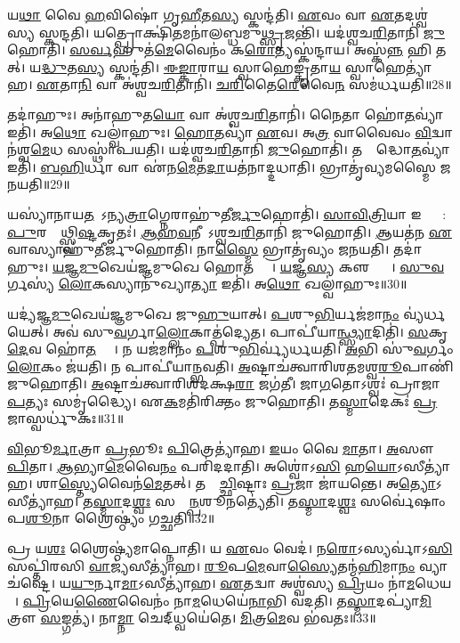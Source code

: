 𑌯\ul{𑌥𑌾} 𑌵𑍈 \ul{𑌹}𑌵𑌿𑌷𑍋॑ 𑌗𑍃\ul{𑌹𑍀}𑌤\ul{𑌸𑍍𑌯} 𑌸𑍍𑌕𑌨𑍍𑌦॑𑌤𑌿।
\ul{𑌏}𑌵𑌂 𑌵𑌾 \ul{𑌏}𑌤𑌦𑌶𑍍𑌵॑𑌸𑍍𑌯 𑌸𑍍𑌕𑌨𑍍𑌦𑌤𑌿।
𑌯𑌤𑍍𑌪𑍍𑌰𑍋𑌕𑍍𑌷𑌿॑\ul{𑌤}𑌮𑌨𑌾॑𑌲𑌬𑍍𑌧𑌮𑍁\ul{𑌥𑍍𑌸𑍃}𑌜𑌨𑍍𑌤𑌿॑।
𑌯𑌦॑𑌶𑍍𑌵𑌚\ul{𑌰𑌿}𑌤𑌾𑌨𑌿॑ \ul{𑌜𑍁}𑌹𑍋𑌤𑌿॑।
\ul{𑌸}\ul{𑌰𑍍𑌵}𑌹𑍁𑌤॑\ul{𑌮𑍇}𑌵𑍈𑌨𑌂॑ 𑌕\ul{𑌰𑍋}𑌤𑍍𑌯𑌸𑍍𑌕॑𑌨𑍍𑌦𑌾𑌯।
𑌅𑌸𑍍𑌕॑\ul{𑌨𑍍𑌨}\ul{} 𑌹𑌿 𑌤𑌤𑍍।
𑌯\ul{𑌦𑍍𑌧𑍁}𑌤\ul{𑌸𑍍𑌯} 𑌸𑍍𑌕𑌨𑍍𑌦॑𑌤𑌿।
\ul{𑌈}\ul{𑌙𑍍𑌕𑌾}𑌰𑌾\ul{𑌯} 𑌸𑍍𑌵𑌾𑌹𑍇𑌙𑍍𑌕𑍃॑𑌤𑌾\ul{𑌯} 𑌸𑍍𑌵𑌾𑌹𑍇𑌤𑍍𑌯𑌾॑𑌹।
\ul{𑌏}𑌤𑌾\ul{𑌨𑌿} 𑌵𑌾 𑌅॑𑌶𑍍𑌵𑌚\ul{𑌰𑌿}𑌤𑌾𑌨𑌿॑।
\ul{𑌚}\ul{𑌰𑌿}𑌤𑍈\ul{𑌰𑍇}𑌵𑍈\ul{𑌨}\ul{} 𑌸𑌮॑𑌰𑍍𑌧𑌯𑌤𑌿॥28॥

𑌤𑌦𑌾॑𑌹𑍁𑌃।
𑌅𑌨𑌾॑𑌹𑍁𑌤\ul{𑌯𑍋} 𑌵𑌾 𑌅॑𑌶𑍍𑌵𑌚\ul{𑌰𑌿}𑌤𑌾𑌨𑌿॑।
𑌨𑍈𑌤𑌾 𑌹𑍋॑\ul{𑌤}𑌵𑍍𑌯𑌾॑ 𑌇𑌤𑌿॑।
𑌅\ul{𑌥𑍋} 𑌖𑌲𑍍𑌵𑌾॑𑌹𑍁𑌃।
\ul{𑌹𑍋}\ul{𑌤}𑌵𑍍𑌯𑌾॑ \ul{𑌏}𑌵।
𑌅\ul{𑌤𑍍𑌰} 𑌵𑌾𑌵𑍈𑌵𑌂 \ul{𑌵𑌿}𑌦𑍍𑌵𑌾𑌨॑𑌶𑍍𑌵\ul{𑌮𑍇}𑌧 𑌸𑌸𑍍𑌥𑌾॑𑌪𑌯𑌤𑌿।
𑌯𑌦॑𑌶𑍍𑌵𑌚\ul{𑌰𑌿}𑌤𑌾𑌨𑌿॑ \ul{𑌜𑍁}𑌹𑍋𑌤𑌿॑।
𑌤𑌸𑍍𑌮𑌾᳚𑌦𑍍𑌧𑍋\ul{𑌤}𑌵𑍍𑌯𑌾॑ 𑌇𑌤𑌿॑।
\ul{𑌬}\ul{𑌹𑌿}𑌰𑍍𑌧𑌾 𑌵𑌾 𑌏॑𑌨\ul{𑌮𑍇}𑌤\ul{𑌦𑌾}𑌯𑌤॑𑌨𑌾𑌦𑍍𑌦𑌧𑌾𑌤𑌿।
𑌭𑍍𑌰𑌾𑌤𑍃॑𑌵𑍍𑌯𑌮𑌸𑍍𑌮𑍈 𑌜𑌨𑌯𑌤𑌿॥29॥

𑌯𑌸𑍍𑌯𑌾॑𑌨𑌾𑌯\ul{𑌤}𑌨𑍇᳚\-𑌽𑌨𑍍𑌯\ul{𑌤𑍍𑌰𑌾}𑌗𑍍𑌨𑍇𑌰𑌾𑌹𑍁॑𑌤𑍀\ul{𑌰𑍍𑌜𑍁}𑌹𑍋𑌤𑌿॑।
\ul{𑌸𑌾}\ul{𑌵𑌿}\ul{𑌤𑍍𑌰𑌿}𑌯𑌾 𑌇𑌷𑍍𑌟𑍍𑌯𑌾᳚: \ul{𑌪𑍁}𑌰𑌸𑍍𑌤𑌾᳚𑌥𑍍𑌸𑍍𑌵𑌿\ul{𑌷𑍍𑌟}𑌕𑍃𑌤𑌃॑।
\ul{𑌆}\ul{𑌹}\ul{𑌵}𑌨𑍀𑌯𑍇᳚\-𑌽𑌶𑍍𑌵𑌚\ul{𑌰𑌿}𑌤𑌾𑌨𑌿॑ 𑌜𑍁𑌹𑍋𑌤𑌿।
\ul{𑌆}𑌯𑌤॑𑌨 \ul{𑌏}𑌵𑌾𑌸𑍍𑌯𑌾𑌹𑍁॑𑌤𑍀𑌰𑍍𑌜𑍁𑌹𑍋𑌤𑌿।
𑌨𑌾\ul{𑌸𑍍𑌮𑍈} 𑌭𑍍𑌰𑌾𑌤𑍃॑𑌵𑍍𑌯𑌂 𑌜𑌨𑌯𑌤𑌿।
𑌤𑌦𑌾॑𑌹𑍁𑌃।
\ul{𑌯}\ul{𑌜𑍍𑌞}\ul{𑌮𑍁}𑌖𑍇𑌯॑𑌜𑍍𑌞𑌮𑍁𑌖𑍇 𑌹𑍋\ul{𑌤}𑌵𑍍𑌯𑌾𑌃᳚।
\ul{𑌯}𑌜𑍍𑌞\ul{𑌸𑍍𑌯} 𑌕𑍢𑌪𑍍𑌤𑍍𑌯𑍈᳚।
\ul{𑌸𑍁}\ul{𑌵}𑌰𑍍𑌗𑌸𑍍𑌯॑ \ul{𑌲𑍋}𑌕𑌸𑍍𑌯𑌾𑌨𑍁॑𑌖𑍍𑌯𑌾\ul{𑌤𑍍𑌯𑌾} 𑌇𑌤𑌿॑।
𑌅\ul{𑌥𑍋} 𑌖𑌲𑍍𑌵𑌾॑𑌹𑍁𑌃॥30॥

𑌯𑌦𑍍𑌯॑𑌜𑍍𑌞\ul{𑌮𑍁}𑌖𑍇𑌯॑𑌜𑍍𑌞𑌮𑍁𑌖𑍇 𑌜𑍁\ul{𑌹𑍁}𑌯𑌾𑌤𑍍।
\ul{𑌪}𑌶𑍁\ul{𑌭𑌿}𑌰𑍍𑌯𑌜॑𑌮𑌾\ul{𑌨𑌂} 𑌵𑍍𑌯॑𑌰𑍍𑌧𑌯𑍇𑌤𑍍।
𑌅𑌵॑ 𑌸𑍁\ul{𑌵}𑌰𑍍𑌗𑌾\ul{𑌲𑍍𑌲𑍋}𑌕𑌾𑌤𑍍𑌪॑𑌦𑍍𑌯𑍇𑌤।
𑌪𑌾𑌪𑍀॑𑌯𑌾\ul{𑌨𑍍𑌥𑍍𑌸𑍍𑌯𑌾}𑌦𑌿𑌤𑌿॑।
\ul{𑌸}𑌕𑍃\ul{𑌦𑍇}𑌵 𑌹𑍋॑\ul{𑌤}𑌵𑍍𑌯𑌾𑌃᳚।
𑌨 𑌯𑌜॑𑌮𑌾𑌨𑌂 \ul{𑌪}𑌶𑍁\ul{𑌭𑌿}𑌰𑍍𑌵𑍍𑌯॑𑌰𑍍𑌧𑌯𑌤𑌿।
\ul{𑌅}𑌭𑌿 𑌸𑍁॑\ul{𑌵}𑌰𑍍𑌗𑌂 \ul{𑌲𑍋}𑌕𑌂 𑌜॑𑌯𑌤𑌿।
𑌨 𑌪𑌾𑌪𑍀॑𑌯𑌾𑌨𑍍𑌭𑌵𑌤𑌿।
\ul{𑌅}𑌷𑍍𑌟𑌾𑌚॑𑌤𑍍𑌵𑌾𑌰𑌿𑌶𑌤𑌮𑌶𑍍𑌵\ul{𑌰𑍂}𑌪𑌾𑌣𑌿॑ 𑌜𑍁𑌹𑍋𑌤𑌿।
\ul{𑌅}𑌷𑍍𑌟𑌾𑌚॑𑌤𑍍𑌵𑌾𑌰𑌿𑌶𑌦𑌕𑍍𑌷\ul{𑌰𑌾} 𑌜𑌗॑𑌤𑍀।
𑌜𑌾\ul{𑌗}𑌤𑍋\-𑌽𑌶𑍍𑌵𑌃॑ 𑌪𑍍𑌰𑌾𑌜𑌾\ul{𑌪}𑌤𑍍𑌯𑌃 𑌸𑌮𑍃॑𑌦𑍍𑌧𑍍𑌯𑍈।
𑌏\ul{𑌕}𑌮𑌤𑌿॑𑌰𑌿𑌕𑍍𑌤𑌂 𑌜𑍁𑌹𑍋𑌤𑌿।
𑌤\ul{𑌸𑍍𑌮𑌾}𑌦𑍇𑌕𑌃॑ \ul{𑌪𑍍𑌰}𑌜𑌾𑌸𑍍𑌵𑌰𑍍𑌧𑍁॑𑌕𑌃॥31॥\anuvakamend[\ul{𑌅}\ul{𑌰𑍍𑌧}\ul{𑌯}\ul{𑌤𑌿} \ul{𑌜}\ul{𑌨}\ul{𑌯}\ul{𑌤𑌿} 𑌖𑌲𑍍𑌵𑌾॑\ul{𑌹𑍁}𑌰𑍍𑌜𑌗॑\ul{𑌤𑍀} 𑌤𑍍𑌰𑍀𑌣𑌿॑ 𑌚]

\ul{𑌵𑌿}𑌭𑍂\ul{𑌰𑍍𑌮𑌾}𑌤𑍍𑌰𑌾 \ul{𑌪𑍍𑌰}𑌭𑍂𑌃 \ul{𑌪𑌿}𑌤𑍍𑌰𑍇𑌤𑍍𑌯𑌾॑𑌹।
\ul{𑌇}𑌯𑌂 𑌵𑍈 \ul{𑌮𑌾}𑌤𑌾।
\ul{𑌅}𑌸𑍗 \ul{𑌪𑌿}𑌤𑌾।
\ul{𑌆}𑌭𑍍𑌯𑌾\ul{𑌮𑍇}𑌵𑍈\ul{𑌨𑌂} 𑌪𑌰𑌿॑𑌦𑌦𑌾𑌤𑌿।
𑌅𑌶𑍍𑌵𑍋॑𑌽\ul{𑌸𑌿} 𑌹\ul{𑌯𑍋}\-𑌽𑌸𑍀𑌤𑍍𑌯𑌾॑𑌹।
𑌶𑌾\ul{𑌸𑍍𑌤𑍍𑌯𑍇}𑌵𑍈𑌨॑\ul{𑌮𑍇}𑌤𑌤𑍍।
𑌤𑌸𑍍𑌮𑌾᳚\ul{𑌚𑍍𑌛𑌿}𑌷𑍍𑌟𑌾𑌃 \ul{𑌪𑍍𑌰}𑌜𑌾 𑌜𑌾॑𑌯𑌨𑍍𑌤𑍇।
𑌅\ul{𑌤𑍍𑌯𑍋}\-𑌽𑌸𑍀𑌤𑍍𑌯𑌾॑𑌹।
𑌤\ul{𑌸𑍍𑌮𑌾}𑌦\ul{𑌶𑍍𑌵𑌃} 𑌸𑌰𑍍𑌵𑌾᳚\ul{𑌨𑍍𑌪}𑌶𑍂𑌨𑌤𑍍𑌯𑍇॑𑌤𑌿।
𑌤\ul{𑌸𑍍𑌮𑌾}𑌦\ul{𑌶𑍍𑌵𑌃} 𑌸𑌰𑍍𑌵𑍇॑𑌷𑌾𑌂 𑌪\ul{𑌶𑍂}𑌨𑌾 𑌶𑍍𑌰𑍈𑌷𑍍𑌠𑍍𑌯𑌂॑ 𑌗𑌚𑍍𑌛𑌤𑌿॥32॥

𑌪𑍍𑌰 𑌯\ul{𑌶𑌃} 𑌶𑍍𑌰𑍈𑌷𑍍𑌠𑍍𑌯॑𑌮𑌾𑌪𑍍𑌨𑍋𑌤𑌿।
𑌯 \ul{𑌏}𑌵𑌂 𑌵𑍇𑌦॑।
𑌨\ul{𑌰𑍋}𑌽𑌸𑍍𑌯𑌰𑍍𑌵𑌾॑𑌽\ul{𑌸𑌿} 𑌸𑌪𑍍𑌤𑌿॑𑌰𑌸𑌿 \ul{𑌵𑌾}𑌜𑍍𑌯॑𑌸𑍀𑌤𑍍𑌯𑌾॑𑌹।
\ul{𑌰𑍂}𑌪\ul{𑌮𑍇}𑌵𑌾\ul{𑌸𑍍𑌯𑍈}𑌤𑌨𑍍𑌮॑\ul{𑌹𑌿}𑌮𑌾\ul{𑌨𑌂} 𑌵𑍍𑌯𑌾𑌚॑𑌷𑍍𑌟𑍇।
𑌯\ul{𑌯𑍁}𑌰𑍍𑌨𑌾\ul{𑌮𑌾}\-𑌽𑌸𑍀𑌤𑍍𑌯𑌾॑𑌹।
\ul{𑌏}𑌤𑌦𑍍𑌵𑌾 𑌅𑌶𑍍𑌵॑𑌸𑍍𑌯 \ul{𑌪𑍍𑌰𑌿}𑌯𑌂 𑌨𑌾॑\ul{𑌮}𑌧𑍇𑌯𑌮𑍍᳚।
\ul{𑌪𑍍𑌰𑌿}𑌯𑍇\ul{𑌣𑍈}𑌵𑍈𑌨𑌂॑ 𑌨𑌾\ul{𑌮}𑌧𑍇𑌯𑍇॑\ul{𑌨𑌾}𑌭𑌿 𑌵॑𑌦𑌤𑌿।
𑌤\ul{𑌸𑍍𑌮𑌾}𑌦𑌪𑍍𑌯𑌾॑\ul{𑌮𑌿}𑌤𑍍𑌰𑍗 \ul{𑌸}𑌙𑍍𑌗𑌤𑍍𑌯॑।
𑌨𑌾\ul{𑌮𑍍𑌨𑌾} 𑌚𑍇𑌦𑍍‌𑌧𑍍𑌵𑌯𑍇॑𑌤𑍇।
\ul{𑌮𑌿}𑌤𑍍𑌰\ul{𑌮𑍇}𑌵 𑌭॑𑌵𑌤𑌃॥33॥

